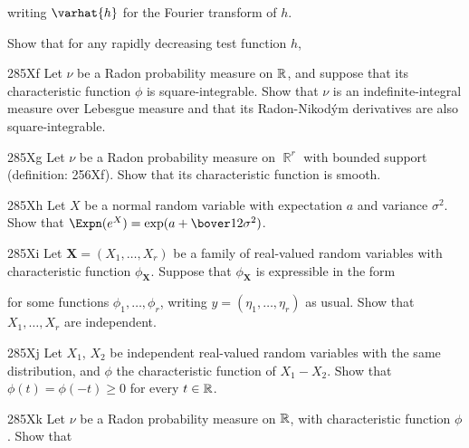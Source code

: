 {\noindent writing $\varhat{h}$ for the Fourier transform of $h$.

 Show that for any rapidly decreasing test function $h$,


\spheader 285Xf Let $\nu$ be a Radon probability measure on
$\Bbb R$, and suppose that its characteristic function $\phi$ is
square-integrable.   Show that $\nu$ is an indefinite-integral measure
over Lebesgue measure and that its Radon-Nikod\'ym derivatives are also
square-integrable.   

\spheader 285Xg Let $\nu$ be a Radon probability
measure on $\BbbR^r$ with bounded support (definition: 256Xf).   Show that
its characteristic function is smooth.

\spheader 285Xh Let $X$ be a normal random variable with expectation $a$
and variance $\sigma^2$.   Show that $\Expn(e^X)=\exp(a+\bover12\sigma^2)$.

\sqheader 285Xi Let $\pmb{X}=(X_1,\ldots,X_r)$ be a family of
real-valued random variables with characteristic function
$\phi_{\pmb{X}}$.   Suppose that $\phi_{\pmb{X}}$ is expressible in the
form


\noindent for some functions $\phi_1,\ldots,\phi_r$, writing
$y=(\eta_1,\ldots,\eta_r)$ as usual.   Show that $X_1,\ldots,X_r$ are
independent.   

\spheader 285Xj Let $X_1$, $X_2$ be independent real-valued random
variables with the same distribution, and $\phi$ the characteristic
function of $X_1-X_2$.   Show that $\phi(t)=\phi(-t)\ge 0$ for every
$t\in\Bbb R$.

\spheader 285Xk Let $\nu$ be a Radon probability measure on
$\Bbb R$, with characteristic function $\phi$.   Show that


}

